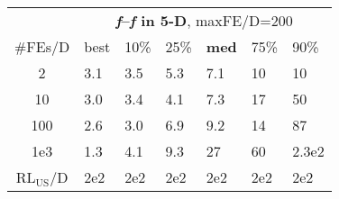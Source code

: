 \begin{tabular}{c|llllll}
 & \multicolumn{6}{|c}{\textbf{\textit{f}\raisebox{-0.35ex}{1}--\textit{f}\raisebox{-0.35ex}{24} in 5-D}, maxFE/D=200}\\
\#FEs/D & best & 10\% & 25\% & \textbf{med} & 75\% & 90\%\\
2 & \hspace*{1ex}3.1 & \hspace*{1ex}3.5 & \hspace*{1ex}5.3 & \hspace*{1ex}7.1 & 10 & 10\\
10 & \hspace*{1ex}3.0 & \hspace*{1ex}3.4 & \hspace*{1ex}4.1 & \hspace*{1ex}7.3 & 17 & 50\\
100 & \hspace*{1ex}2.6 & \hspace*{1ex}3.0 & \hspace*{1ex}6.9 & \hspace*{1ex}9.2 & 14 & 87\\
1e3 & \hspace*{1ex}1.3 & \hspace*{1ex}4.1 & \hspace*{1ex}9.3 & 27 & 60 & 2.3e2\\
$\text{RL}_{\text{US}}$/D & 2e2 & 2e2 & 2e2 & 2e2 & 2e2 & 2e2
\end{tabular}
